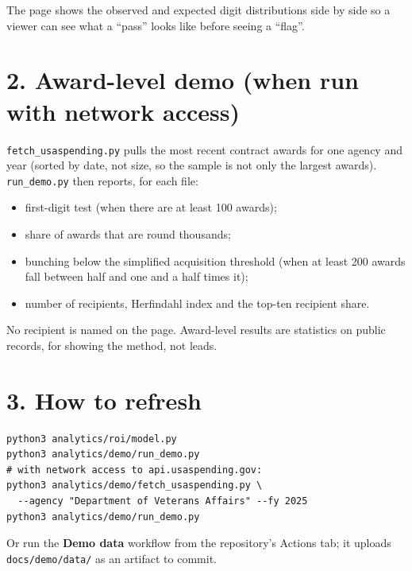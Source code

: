 \documentclass[letterpaper,11pt]{article}
\providecommand{\tightlist}{\setlength{\itemsep}{0pt}\setlength{\parskip}{0pt}}
\begin{document}
The page shows the observed and expected digit distributions side by
side so a viewer can see what a ``pass'' looks like before seeing a
``flag''.

\hypertarget{award-level-demo-when-run-with-network-access}{%
\section*{2. Award-level demo (when run with network
access)}\label{award-level-demo-when-run-with-network-access}}

\texttt{fetch\_usaspending.py} pulls the most recent contract awards for
one agency and year (sorted by date, not size, so the sample is not only
the largest awards). \texttt{run\_demo.py} then reports, for each file:

\begin{itemize}
\tightlist
\item
  first-digit test (when there are at least 100 awards);
\item
  share of awards that are round thousands;
\item
  bunching below the simplified acquisition threshold (when at least 200
  awards fall between half and one and a half times it);
\item
  number of recipients, Herfindahl index and the top-ten recipient
  share.
\end{itemize}

No recipient is named on the page. Award-level results are statistics on
public records, for showing the method, not leads.

\hypertarget{how-to-refresh}{%
\section*{3. How to refresh}\label{how-to-refresh}}

\begin{verbatim}
python3 analytics/roi/model.py
python3 analytics/demo/run_demo.py
# with network access to api.usaspending.gov:
python3 analytics/demo/fetch_usaspending.py \
  --agency "Department of Veterans Affairs" --fy 2025
python3 analytics/demo/run_demo.py
\end{verbatim}

Or run the \textbf{Demo data} workflow from the repository's Actions
tab; it uploads \texttt{docs/demo/data/} as an artifact to commit.
\end{document}
